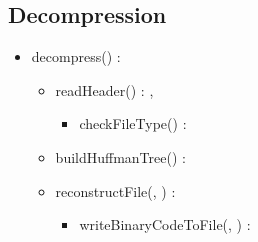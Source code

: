 \subsection{Decompression}


\begin{itemize}
    \item decompress(\binaryFile) : \binaryFile
    \begin{itemize}
        \item readHeader(\binaryFile) : \statistics, \booleen
        \begin{itemize}
            \item checkFileType(\binaryFile) : \booleen
        \end{itemize}
        \item buildHuffmanTree(\statistics) : \huffmanTree
        \item reconstructFile(\binaryFile, \huffmanTree) : \binaryFile
        \begin{itemize}
            \item writeBinaryCodeToFile(\binaryFile, \byte) : \binaryFile
        \end{itemize}
    \end{itemize}
\end{itemize}
